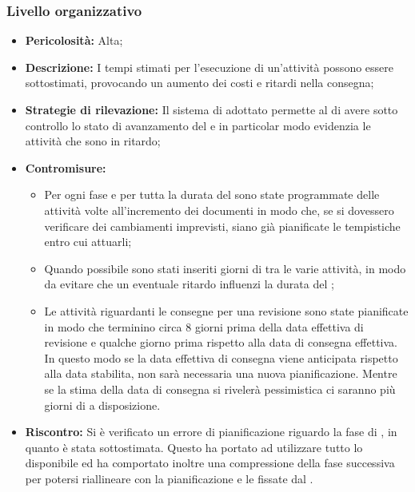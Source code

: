 \subsubsection{Livello organizzativo}\label{lo}
\label{r_stima}
\begin{itemize}
\item \textbf{Pericolosità:} Alta;
\item \textbf{Descrizione:} I tempi stimati per l'esecuzione di un'attività possono essere sottostimati, provocando un aumento dei costi e ritardi nella consegna;
\item \textbf{Strategie di rilevazione:} Il sistema di  adottato permette al \rRP di avere sotto controllo lo stato di avanzamento del  e in particolar modo evidenzia le attività che sono in ritardo;
\item \textbf{Contromisure:}
\begin{itemize}
\item Per ogni fase e per tutta la durata del  sono state programmate delle attività volte all'incremento dei documenti in modo che, se si dovessero verificare dei cambiamenti imprevisti, siano già pianificate le tempistiche entro cui attuarli;
\item Quando possibile sono stati inseriti giorni di  tra le varie attività, in modo da evitare che un eventuale ritardo influenzi la durata del ;
\item Le attività riguardanti le consegne per una revisione sono state pianificate in modo che terminino circa 8 giorni prima della data effettiva di revisione e qualche giorno prima rispetto alla data di consegna effettiva. In questo modo se la data effettiva di consegna viene anticipata rispetto alla data stabilita, non sarà necessaria una nuova pianificazione. Mentre se la stima della data di consegna si rivelerà pessimistica ci saranno più giorni di  a disposizione.
\end{itemize}
\item \textbf{Riscontro:}
Si è verificato un errore di pianificazione riguardo la fase di \fAD, in quanto è stata sottostimata. Questo ha portato ad utilizzare tutto lo  disponibile ed ha comportato inoltre una compressione della fase successiva per potersi riallineare con la pianificazione e le  fissate dal \rRP.
\end{itemize}
